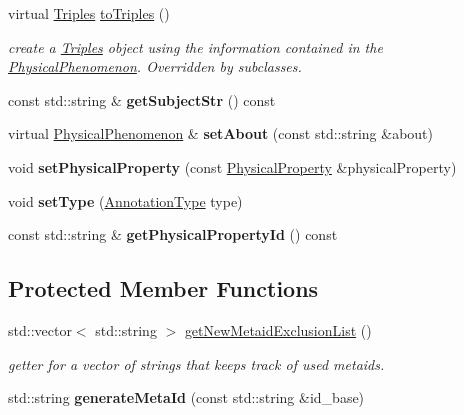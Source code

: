\begin{DoxyCompactItemize}
virtual \hyperlink{classomexmeta_1_1Triples}{Triples} \hyperlink{classomexmeta_1_1PhysicalPhenomenon_a30617e685bd8b155a76d38ab5a9db273}{to\+Triples} ()
\begin{DoxyCompactList}\small\item\em create a \hyperlink{classomexmeta_1_1Triples}{Triples} object using the information contained in the \hyperlink{classomexmeta_1_1PhysicalPhenomenon}{Physical\+Phenomenon}. Overridden by subclasses. \end{DoxyCompactList}\item 
\mbox{\label{classomexmeta_1_1PhysicalPhenomenon_ae99e667cbceff2da0c4c0f5c64a8ba8f}} 
const std\+::string \& {\bfseries get\+Subject\+Str} () const
\item 
\mbox{\label{classomexmeta_1_1PhysicalPhenomenon_a80a3e9f413cc665248a22fd8657ff74d}} 
virtual \hyperlink{classomexmeta_1_1PhysicalPhenomenon}{Physical\+Phenomenon} \& {\bfseries set\+About} (const std\+::string \&about)
\item 
\mbox{\label{classomexmeta_1_1PhysicalPhenomenon_afad41dbf096b22ab9b64441cb25e9db9}} 
void {\bfseries set\+Physical\+Property} (const \hyperlink{classomexmeta_1_1PhysicalProperty}{Physical\+Property} \&physical\+Property)
\item 
\mbox{\label{classomexmeta_1_1PhysicalPhenomenon_a4c27a0b0e430df95b3cffaf268973eec}} 
void {\bfseries set\+Type} (\hyperlink{namespaceomexmeta_a1129ebb8a92218ebb27b9c76ac8462f7}{Annotation\+Type} type)
\item 
\mbox{\label{classomexmeta_1_1PhysicalPhenomenon_aca53e0f8ce8139a919f48372b254a5d0}} 
const std\+::string \& {\bfseries get\+Physical\+Property\+Id} () const
\end{DoxyCompactItemize}
\subsection*{Protected Member Functions}
\begin{DoxyCompactItemize}
\item 
std\+::vector$<$ std\+::string $>$ \hyperlink{classomexmeta_1_1PhysicalPhenomenon_a54d90cf6db78e98bd091f478dc5bd74a}{get\+New\+Metaid\+Exclusion\+List} ()
\begin{DoxyCompactList}\small\item\em getter for a vector of strings that keeps track of used metaids. \end{DoxyCompactList}\item 
\mbox{\label{classomexmeta_1_1PhysicalPhenomenon_afe71a5c6399b992922eb6eeda6de49bd}} 
std\+::string {\bfseries generate\+Meta\+Id} (const std\+::string \&id\+\_\+base)
\end{DoxyCompactItemize}
